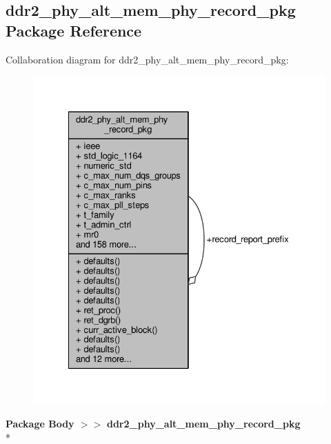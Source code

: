 \subsection{ddr2\+\_\+phy\+\_\+alt\+\_\+mem\+\_\+phy\+\_\+record\+\_\+pkg Package Reference}
\label{classddr2__phy__alt__mem__phy__record__pkg}


Collaboration diagram for ddr2\+\_\+phy\+\_\+alt\+\_\+mem\+\_\+phy\+\_\+record\+\_\+pkg\+:\nopagebreak
\begin{figure}[H]
\begin{center}
\leavevmode
\includegraphics[width=328pt]{df/d63/classddr2__phy__alt__mem__phy__record__pkg__coll__graph}
\end{center}
\end{figure}
{\bfseries Package Body $>$$>$ }{\bf ddr2\+\_\+phy\+\_\+alt\+\_\+mem\+\_\+phy\+\_\+record\+\_\+pkg}\\*
